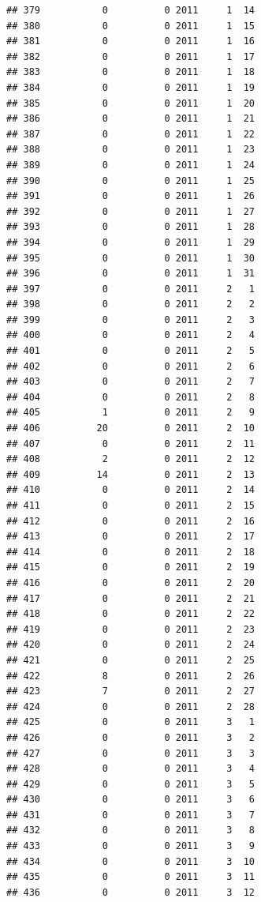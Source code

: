 \documentclass[
]{article}
\begin{document}
\begin{verbatim}
## 379           0          0 2011     1  14
## 380           0          0 2011     1  15
## 381           0          0 2011     1  16
## 382           0          0 2011     1  17
## 383           0          0 2011     1  18
## 384           0          0 2011     1  19
## 385           0          0 2011     1  20
## 386           0          0 2011     1  21
## 387           0          0 2011     1  22
## 388           0          0 2011     1  23
## 389           0          0 2011     1  24
## 390           0          0 2011     1  25
## 391           0          0 2011     1  26
## 392           0          0 2011     1  27
## 393           0          0 2011     1  28
## 394           0          0 2011     1  29
## 395           0          0 2011     1  30
## 396           0          0 2011     1  31
## 397           0          0 2011     2   1
## 398           0          0 2011     2   2
## 399           0          0 2011     2   3
## 400           0          0 2011     2   4
## 401           0          0 2011     2   5
## 402           0          0 2011     2   6
## 403           0          0 2011     2   7
## 404           0          0 2011     2   8
## 405           1          0 2011     2   9
## 406          20          0 2011     2  10
## 407           0          0 2011     2  11
## 408           2          0 2011     2  12
## 409          14          0 2011     2  13
## 410           0          0 2011     2  14
## 411           0          0 2011     2  15
## 412           0          0 2011     2  16
## 413           0          0 2011     2  17
## 414           0          0 2011     2  18
## 415           0          0 2011     2  19
## 416           0          0 2011     2  20
## 417           0          0 2011     2  21
## 418           0          0 2011     2  22
## 419           0          0 2011     2  23
## 420           0          0 2011     2  24
## 421           0          0 2011     2  25
## 422           8          0 2011     2  26
## 423           7          0 2011     2  27
## 424           0          0 2011     2  28
## 425           0          0 2011     3   1
## 426           0          0 2011     3   2
## 427           0          0 2011     3   3
## 428           0          0 2011     3   4
## 429           0          0 2011     3   5
## 430           0          0 2011     3   6
## 431           0          0 2011     3   7
## 432           0          0 2011     3   8
## 433           0          0 2011     3   9
## 434           0          0 2011     3  10
## 435           0          0 2011     3  11
## 436           0          0 2011     3  12

\end{verbatim}
\end{document}
